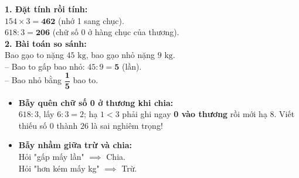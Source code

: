 \documentclass[11pt,a4paper]{article}
\begin{document}
\vspace{-2.5mm}
\noindent
\begin{minipage}[t]{0.49\textwidth}\vspace{0pt}
\begin{tcolorbox}[
  enhanced,
  colback=green!4!white,
  colframe=green!60!black,
  arc=2mm, boxrule=0.8pt,
  left=2mm, right=2mm, top=1.8mm, bottom=1.8mm,
  title={\footnotesize\bfseries\color{white}\faCheckCircle\ Ví dụ thực hành chuẩn mực}
]
{\footnotesize
\textbf{1. Đặt tính rồi tính:}\\
$154 \times 3 = \mathbf{462}$ (nhớ 1 sang chục).\\
$618 : 3 = \mathbf{206}$ (chữ số 0 ở hàng chục của thương).\\
\textbf{2. Bài toán so sánh:}\\
Bao gạo to nặng $45\text{ kg}$, bao gạo nhỏ nặng $9\text{ kg}$.\\
-- Bao to gấp bao nhỏ: $45 : 9 = \mathbf{5}$ (lần).\\
-- Bao nhỏ bằng $\mathbf{\dfrac{1}{5}}$ bao to.
}
\end{tcolorbox}
\end{minipage}
\hfill
\begin{minipage}[t]{0.49\textwidth}\vspace{0pt}
\begin{tcolorbox}[
  enhanced,
  colback=red!4!white,
  colframe=red!70!black,
  arc=2mm, boxrule=0.8pt,
  left=2mm, right=2mm, top=1.8mm, bottom=1.8mm,
  title={\footnotesize\bfseries\color{white}\faExclamationTriangle\ Mẹo tránh bẫy trắc nghiệm}
]
{\footnotesize
\begin{itemize}\setlength{\itemsep}{1.5pt}\setlength{\leftskip}{-2.5mm}
  \item \textbf{Bẫy quên chữ số 0 ở thương khi chia:}\\
  $618 : 3$, lấy $6 : 3 = 2$; hạ $1 < 3$ phải ghi ngay \textbf{0 vào thương} rồi mới hạ $8$. Viết thiếu số 0 thành $26$ là sai nghiêm trọng!
  \item \textbf{Bẫy nhầm giữa trừ và chia:}\\
  Hỏi "gấp mấy lần" $\implies$ Chia.\\
  Hỏi "hơn kém mấy kg" $\implies$ Trừ.
\end{itemize}
}
\end{tcolorbox}
\end{minipage}
\end{document}
